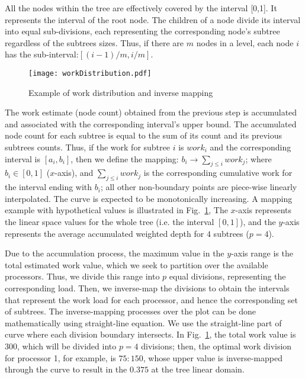 \documentclass[conference,compsoc]{IEEEtran}
\begin{document}
All the nodes within the tree are effectively covered by the interval [0,1]. It represents the interval of the root node. The children of a node divide its interval into equal sub-divisions, each representing the corresponding node's subtree regardless of the subtrees sizes. Thus, if there are $ m $ nodes in a level, each node $ i $ has the sub-interval:$ [(i-1)/m, i/m] $.

\begin{figure}
	\centering
	\texttt{[image: workDistribution.pdf]}
	\caption{\label{figWorkDistribution}Example of work distribution and inverse mapping}
\end{figure}

The work estimate (node count) obtained from the previous step is accumulated and associated with the corresponding interval's upper bound. The accumulated node count for each subtree is equal to the sum of its count and its previous subtrees counts. Thus, if the work for subtree $ i $ is $ work_i $ and the corresponding interval is $ [a_i, b_i] $, then we define the mapping:  $ b_i \rightarrow \sum_{j \leq i}\mathit{work}_j  $; where $ b_i \in [0,1]$  ($x$-axis), and $\sum_{j \leq i} \mathit{work}_j$ is the corresponding cumulative work for the interval ending with $b_{i}$; all other non-boundary points are piece-wise linearly interpolated. The curve
is expected to be monotonically increasing. A mapping example with hypothetical values is illustrated in Fig.~\ref{figWorkDistribution}, The $ x $-axis represents the linear space values for the whole tree (i.e. the interval $ [0,1] $), and the $ y $-axis represents the average accumulated weighted depth for $ 4 $ subtrees ($ p=4 $).

Due to the accumulation process, the maximum value in the $ y $-axis range is  the total estimated work value, which we seek to partition over the available processors. Thus, we divide this range into $ p $ equal divisions, representing the corresponding load. Then, we inverse-map the divisions to obtain the intervals that represent the work load for each processor, and hence the corresponding set of subtrees. The inverse-mapping processes over the plot can be done mathematically using straight-line equation. We use the straight-line part of curve where each division boundary intersects. In Fig.~\ref{figWorkDistribution}, the total work value is 300, which will be divided into $ p=4 $ divisions; then, the optimal work division for processor 1, for example, is $ 75:150 $, whose upper value is inverse-mapped through the curve to result in the $ 0.375 $ at the tree linear domain. 
\end{document}
